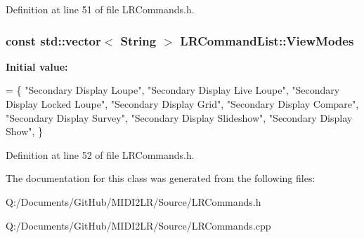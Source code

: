 Definition at line 51 of file L\+R\+Commands.\+h.

\subsubsection[{\texorpdfstring{View\+Modes}{ViewModes}}]{\setlength{\rightskip}{0pt plus 5cm}const std\+::vector$<$ String $>$ L\+R\+Command\+List\+::\+View\+Modes\hspace{0.3cm}{\ttfamily [static]}}\hypertarget{class_l_r_command_list_a9bbb69e27d10c3345b2301871e16c698}{}\label{class_l_r_command_list_a9bbb69e27d10c3345b2301871e16c698}
{\bfseries Initial value\+:}
\begin{DoxyCode}
= \{
    \textcolor{stringliteral}{"Secondary Display Loupe"},
    \textcolor{stringliteral}{"Secondary Display Live Loupe"},
    \textcolor{stringliteral}{"Secondary Display Locked Loupe"},
    \textcolor{stringliteral}{"Secondary Display Grid"},
    \textcolor{stringliteral}{"Secondary Display Compare"},
    \textcolor{stringliteral}{"Secondary Display Survey"},
    \textcolor{stringliteral}{"Secondary Display Slideshow"},
    \textcolor{stringliteral}{"Secondary Display Show"},
\}
\end{DoxyCode}


Definition at line 52 of file L\+R\+Commands.\+h.



The documentation for this class was generated from the following files\+:\begin{DoxyCompactItemize}
\item 
Q\+:/\+Documents/\+Git\+Hub/\+M\+I\+D\+I2\+L\+R/\+Source/L\+R\+Commands.\+h\item 
Q\+:/\+Documents/\+Git\+Hub/\+M\+I\+D\+I2\+L\+R/\+Source/L\+R\+Commands.\+cpp\end{DoxyCompactItemize}
